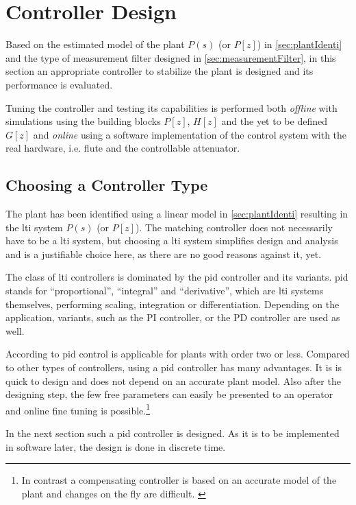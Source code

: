 \newpage
\section{Controller Design}
Based on the estimated model of the plant $P(s)$ (or $P[z]$) in \autoref{sec:plantIdenti} and the type of measurement filter designed in \autoref{sec:measurementFilter}, in this section an appropriate controller to stabilize the plant is designed and its performance is evaluated.

Tuning the controller and testing its capabilities is performed both \textit{offline} with simulations using the building blocks $P[z]$, $H[z]$ and the yet to be defined $G[z]$ and \textit{online} using a software implementation of the control system with the real hardware, i.e. \gls{flute} and the controllable attenuator.

\subsection{Choosing a Controller Type}
The plant has been identified using a linear model in \autoref{sec:plantIdenti} resulting in the \gls{lti} system $P(s)$ (or $P[z]$). The matching controller does not necessarily have to be a \gls{lti} system, but choosing a \gls{lti} system simplifies design and analysis and is a justifiable choice here, as there are no good reasons against it, yet.

The class of \gls{lti} controllers is dominated by the \gls{pid} controller and its variants. \gls{pid} stands for ``proportional'', ``integral'' and ``derivative'', which are \gls{lti} systems themselves, performing scaling, integration or differentiation. Depending on the application, variants, such as the PI controller, or the PD controller are used as well.

According to \cite[p.~111]{Aastroem1995} \gls{pid} control is applicable for plants with order two or less.
Compared to other types of controllers, using a \gls{pid} controller has many advantages. It is is quick to design and does not depend on an accurate plant model. Also after the designing step, the few free parameters can easily be presented to an operator and online fine tuning is possible.\footnote{In contrast a compensating controller is based on an accurate model of the plant and changes on the fly are difficult. \cite{SergeZacher2010}}

In the next section such a \gls{pid} controller is designed. As it is to be implemented in software later, the design is done in discrete time.

